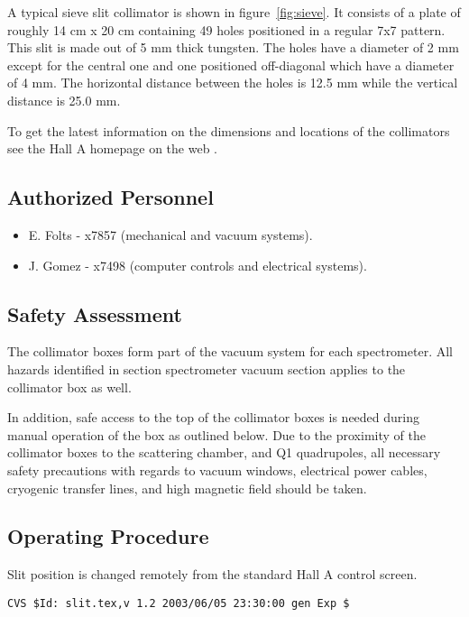 A typical sieve slit collimator is shown in figure~\ref{fig:sieve}. It consists of 
a plate of roughly 14 cm x 20 cm containing 49 holes
positioned in a regular 7x7 pattern. This slit is made out of 5
mm thick tungsten.
The holes have a diameter of 2 mm except for the central one and one positioned
off-diagonal which have a diameter of 4 mm. The horizontal distance between the
holes is 12.5 mm while the vertical distance is 25.0 mm.

To get the latest information on the dimensions and locations of the collimators see 
the Hall A homepage on the web%
.

\subsection{Authorized  Personnel} 

\begin{itemize} 
\item[~]E. Folts - x7857 (mechanical and vacuum systems).
\item[~]J. Gomez - x7498 (computer controls and electrical systems).
\end{itemize} 

\subsection{Safety Assessment}

The collimator boxes form part of the vacuum system for each spectrometer. All hazards
identified in section spectrometer vacuum section applies to the collimator box as well.

In addition, safe access to the top of
the collimator boxes is needed  during manual operation of the box as outlined below.
Due to the proximity of the collimator boxes to the scattering chamber, and Q1 quadrupoles,
all necessary safety precautions with regards to vacuum windows, electrical power cables, 
cryogenic transfer lines, and high magnetic field should be taken.

\subsection{Operating Procedure}
Slit position is changed remotely from the standard Hall A control screen.
%
%
{\small
\begin{verbatim}CVS $Id: slit.tex,v 1.2 2003/06/05 23:30:00 gen Exp $\end{verbatim}
}
